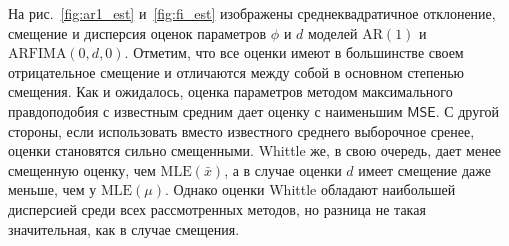 \documentclass[specialist,
substylefile = spbu_report.rtx,
subf,href,colorlinks=true, 12pt]{disser}
\theoremstyle{definition}
\begin{document}
На рис.~\ref{fig:ar1_est} и~\ref{fig:fi_est} изображены среднеквадратичное отклонение, смещение и дисперсия оценок параметров $\phi$ и $d$ моделей $\mathrm{AR}(1)$ и $\mathrm{ARFIMA}(0, d, 0)$. Отметим, что все оценки имеют в большинстве своем отрицательное смещение и отличаются между собой в основном степенью смещения. Как и ожидалось, оценка параметров методом максимального правдоподобия с известным средним дает оценку с наименьшим $\mathsf{MSE}$. С другой стороны, если использовать вместо известного среднего выборочное сренее, оценки становятся сильно смещенными. Whittle же, в свою очередь, дает менее смещенную оценку, чем $\mathrm{MLE}(\bar x)$, а в случае оценки $d$ имеет смещение даже меньше, чем у $\mathrm{MLE}(\mu)$. Однако оценки Whittle обладают наибольшей дисперсией среди всех рассмотренных методов, но разница не такая значительная, как в случае смещения.
\end{document}
